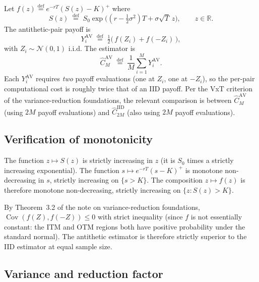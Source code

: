 \documentclass[11pt,a4paper]{article}
\theoremstyle{plain}
\theoremstyle{definition}
\theoremstyle{remark}
\newcommand{\R}{\mathbb{R}}
\newcommand{\Cov}{\operatorname{Cov}}
\newcommand{\eqdef}{\overset{\mathrm{def}}{=}}
\begin{document}
Let $f(z) \eqdef e^{-rT} (S(z) - K)^+$ where
\begin{equation}
S(z) \;\eqdef\; S_0 \exp\!\bigl((r - \tfrac{1}{2}\sigma^2)T + \sigma \sqrt T \, z\bigr),
\qquad z \in \R.
\end{equation}
The antithetic-pair payoff is
\begin{equation}
\label{eq:av-payoff}
Y_i^{\mathrm{AV}} \;\eqdef\; \tfrac{1}{2}\bigl(\, f(Z_i) + f(-Z_i) \,\bigr),
\end{equation}
with $Z_i \sim \mathcal{N}(0,1)$ i.i.d. The estimator is
\begin{equation}
\hat C_M^{\mathrm{AV}} \;\eqdef\; \frac{1}{M} \sum_{i=1}^M Y_i^{\mathrm{AV}}.
\end{equation}
Each $Y_i^{\mathrm{AV}}$ requires \emph{two} payoff evaluations (one
at $Z_i$, one at $-Z_i$), so the per-pair computational cost is
roughly twice that of an IID payoff. Per the VxT criterion of the
variance-reduction foundations,
the relevant comparison is between $\hat C_M^{\mathrm{AV}}$ (using $2M$
payoff evaluations) and $\hat C_{2M}^{\mathrm{IID}}$ (also using $2M$
payoff evaluations).

\subsection{Verification of monotonicity}

The function $z \mapsto S(z)$ is strictly increasing in $z$ (it is
$S_0$ times a strictly increasing exponential). The function $s \mapsto
e^{-rT}(s - K)^+$ is monotone non-decreasing in $s$, strictly
increasing on $\{s > K\}$. The composition $z \mapsto f(z)$ is
therefore monotone non-decreasing, strictly increasing on $\{z : S(z)
> K\}$.

By Theorem~3.2 of the note on variance-reduction foundations,
$\Cov(f(Z), f(-Z)) \leq 0$
with strict inequality (since $f$ is not essentially constant: the
ITM and OTM regions both have positive probability under the standard
normal). The antithetic estimator is therefore strictly superior to
the IID estimator at equal sample size.

\subsection{Variance and reduction factor}
\end{document}
